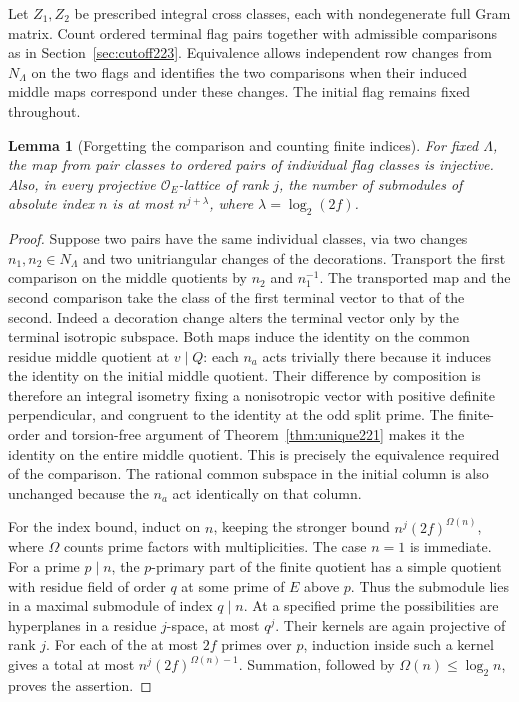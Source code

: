 \documentclass[a4paper,11pt]{article}
\newtheorem{lemma}[proposition]{Lemma}
\theoremstyle{definition}
\theoremstyle{remark}
\numberwithin{equation}{section}
\newcommand{\OO}{\mathcal O}
\begin{document}
Let \(Z_1,Z_2\) be prescribed integral cross classes, each
with nondegenerate full Gram matrix. Count ordered terminal
flag pairs together with admissible comparisons as in
Section~\ref{sec:cutoff223}. Equivalence allows independent
row changes from \(N_\Lambda\) on the two flags and identifies
the two comparisons when their induced middle maps correspond
under these changes. The initial flag remains fixed throughout.

\begin{lemma}[Forgetting the comparison and counting finite indices]
\label{lem:indices225}
For fixed \(\Lambda\), the map from pair classes to ordered
pairs of individual flag classes is injective. Also, in
every projective \(\OO_E\)-lattice of rank \(j\), the number
of submodules of absolute index \(n\) is at most
\(n^{j+\lambda}\), where \(\lambda=\log_2(2f)\).
\end{lemma}
\begin{proof}
Suppose two pairs have the same individual classes, via
two changes \(n_1,n_2\in N_\Lambda\) and two unitriangular
changes of the decorations. Transport the first comparison
on the middle quotients by \(n_2\) and \(n_1^{-1}\). The
transported map and the second comparison take the class
of the first terminal vector to that of the second. Indeed
a decoration change alters the terminal vector only by the
terminal isotropic subspace. Both maps induce the identity
on the common residue middle quotient at \(v\mid Q\):
each \(n_a\) acts trivially there because it induces the
identity on the initial middle quotient. Their difference
by composition is therefore an integral isometry fixing a
nonisotropic vector with positive definite perpendicular,
and congruent to the identity at the odd split prime.
The finite-order and torsion-free argument of
Theorem~\ref{thm:unique221} makes it the identity on the
entire middle quotient. This is precisely the equivalence
required of the comparison. The rational common subspace
in the initial column is also unchanged because the
\(n_a\) act identically on that column.

For the index bound, induct on \(n\), keeping the stronger
bound \(n^j(2f)^{\Omega(n)}\), where \(\Omega\) counts prime
factors with multiplicities. The case \(n=1\) is immediate.
For a prime \(p\mid n\), the \(p\)-primary part of the
finite quotient has a simple quotient with residue field of
order \(q\) at some prime of \(E\) above \(p\). Thus the
submodule lies in a maximal submodule of index \(q\mid n\).
At a specified prime the possibilities are hyperplanes
in a residue \(j\)-space, at most \(q^j\). Their kernels are
again projective of rank \(j\). For each of the at most
\(2f\) primes over \(p\), induction inside such a kernel
gives a total at most \(n^j(2f)^{\Omega(n)-1}\).
Summation, followed by \(\Omega(n)\le\log_2 n\), proves
the assertion.
\end{proof}
\end{document}
